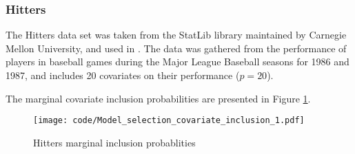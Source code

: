 \documentclass{amsart}[12pt]
\begin{document}





\subsubsection{Hitters}

The Hitters data set was taken from the StatLib library maintained by Carnegie Mellon University, and used in
\citep{James:2014:ISL:2517747}. The data was gathered from the performance of players in baseball games
during the Major League Baseball seasons for 1986 and 1987, and includes 20 covariates on their performance
($p=20$).

The marginal covariate inclusion probabilities are presented in Figure \ref{fig:Hitters_inclusion}.

\begin{figure}[p]
	\texttt{[image: code/Model\_selection\_covariate\_inclusion\_1.pdf]}
	\caption{Hitters marginal inclusion probablities}
	\label{fig:Hitters_inclusion}
\end{figure}
\end{document}
